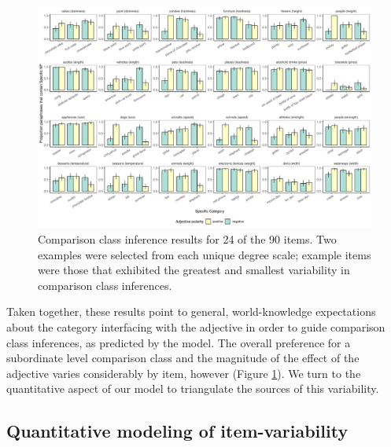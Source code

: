\documentclass[doc]{apa6}
\newcommand{\ndg}[1]{\textcolor{Green}{[ndg: #1]}}
\begin{document}


\begin{figure}[t!]
\centering
\includegraphics[width=\textwidth]{figs/bars_cc_finalExpt_prereg_byItem.pdf}
\caption{Comparison class inference results for 24 of the 90 items. Two examples were selected from each unique degree scale; example items were those that exhibited the greatest and smallest variability in comparison class inferences.}\label{fig:ccInferenceItems}
\end{figure}


Taken together, these results point to general, world-knowledge expectations about the category interfacing with the adjective in order to guide comparison class inferences, as predicted by the model.
The overall preference for a subordinate level comparison class and the magnitude of the effect of the adjective varies considerably by item, however (Figure \ref{fig:ccInferenceItems}).
We turn to the quantitative aspect of our model to triangulate the sources of this variability.

\subsection{Quantitative modeling of item-variability}

\end{document}
